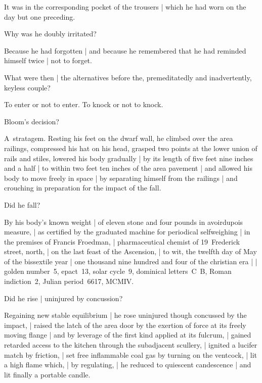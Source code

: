 \Factual
It was in the corresponding pocket of the trousers |
which he had worn on the day but one preceding.


Why was he doubly irritated?

\Bloom
Because he had forgotten |
and because he remembered that
he had reminded himself twice |
not to forget.


What were then |
the alternatives before the,
premeditatedly
and inadvertently,
keyless couple?

\Philosophy
To enter or not to enter.
To knock or not to knock.



Bloom's decision?

\Science
A~stratagem.
Resting his feet on the dwarf wall,
he climbed over the area railings,
compressed his hat on his head,
grasped two points at the lower union of rails and stiles,
lowered his body gradually |
by its length of five feet nine inches and a half |
to within two feet ten inches of the area pavement |
and allowed his body to move freely in space |
by separating himself from the railings |
and crouching in preparation for the impact of the fall.



Did he fall?

\Science
By his body's known weight |
of eleven stone and four pounds in avoirdupois measure, |
as certified by the graduated machine for periodical selfweighing |
in the premises of Francis Froedman, |
pharmaceutical chemist of 19~Frederick street, north, |
on the last feast of the Ascension, |
to wit, the twelfth day of May of the bissextile year |
one thousand nine hundred and four of the christian era |
 |
golden number~5,
epact~13,
solar cycle~9,
dominical letters~C~B,
Roman indiction~2,
Julian period~6617,
MCMIV.



Did he rise |
uninjured by concussion?

\Science
Regaining new stable equilibrium |
he rose uninjured though concussed by the impact, |
raised the latch of the area door
by the exertion of force at its freely moving flange |
and by leverage of the first kind applied at its fulcrum, |
gained retarded access to the kitchen through the subadjacent scullery, |
ignited a lucifer match by friction, |
set free inflammable coal gas by turning on the ventcock, |
lit a high flame which, |
by regulating, |
he reduced to quiescent candescence |
and lit finally a portable candle.


